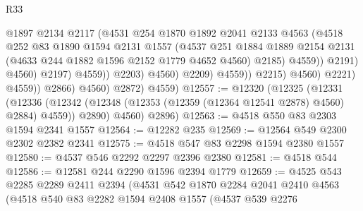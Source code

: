 \begin{lexlean}{R33}
\begin{coremodule}
                                          @1897
                                          @2134
                                          @2117
                                          (@4531
                                            @254
                                            @1870
                                            @1892
                                            @2041
                                            @2133
                                            @4563
                                            (@4518
                                              @252
                                              @83
                                              @1890
                                              @1594
                                              @2131
                                              @1557
                                              (@4537
                                                @251
                                                @1884
                                                @1889
                                                @2154
                                                @2131
                                                (@4633 @244 @1882 @1596 @2152 @1779 @4652 @4560)
                                                @2185)
                                              @4559))
                                          @2191)
                                        @4560)
                                      @2197)
                                    @4559))
                                @2203)
                              @4560)
                            @2209)
                          @4559))
                      @2215)
                    @4560)
                  @2221)
                @4559))
            @2866)
          @4560)
        @2872)
      @4559)
@12557 := @12320
    (@12325
      (@12331
        (@12336 (@12342 (@12348 (@12353 (@12359 (@12364 @12541 @2878) @4560) @2884) @4559)) @2890)
        @4560)
      @2896)
@12563 := @4518 @550 @83 @2303 @1594 @2341 @1557
@12564 := @12282 @235
@12569 := @12564 @549 @2300 @2302 @2382 @2341
@12575 := @4518 @547 @83 @2298 @1594 @2380 @1557
@12580 := @4537 @546 @2292 @2297 @2396 @2380
@12581 := @4518 @544
@12586 := @12581 @244 @2290 @1596 @2394 @1779
@12659 := @4525
    @543
    @2285
    @2289
    @2411
    @2394
    (@4531
      @542
      @1870
      @2284
      @2041
      @2410
      @4563
      (@4518
        @540
        @83
        @2282
        @1594
        @2408
        @1557
        (@4537
          @539
          @2276

\end{coremodule}
\end{lexlean}
